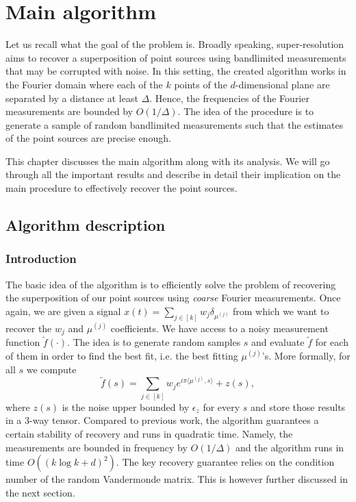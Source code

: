\chapter{Main algorithm}
Let us recall what the goal of the problem is. Broadly speaking, super-resolution aims to recover a superposition of point sources using bandlimited measurements that may be corrupted with noise. In this setting, the created algorithm works in the Fourier domain where each of the $k$ points of the $d$-dimensional plane are separated by a distance at least $\Delta$. Hence, the frequencies of the Fourier measurements are bounded by $O(1/\Delta)$. The idea of the procedure is to generate a sample of random bandlimited measurements such that the estimates of the point sources are precise enough.\par 
This chapter discusses the main algorithm along with its analysis. We will go through all the important results and describe in detail their implication on the main procedure to effectively recover the point sources.

\section{Algorithm description}
\subsection{Introduction}
The basic idea of the algorithm is to efficiently solve the problem of recovering the superposition of our point sources using \textit{coarse} Fourier measurements. Once again, we are given a signal $x(t)=\sum_{j\in[k]}w_j\delta_{\mu^{(j)}}$ from which we want to recover the $w_j$ and $\mu^{(j)}$ coefficients. We have access to a noisy measurement function $\tilde{f}(\cdot)$. The idea is to generate random samples $s$ and evaluate $\tilde{f}$ for each of them in order to find the best fit, i.e. the best fitting $\mu^{(j)}$'s. More formally, for all $s$ we compute $$\tilde{f}(s)=\sum_{j\in[k]}w_je^{i\pi\langle\mu^{(j)},s\rangle}+z(s),$$ where $z(s)$ is the noise upper bounded by $\epsilon_z$ for every $s$ and store those results in a 3-way tensor. Compared to previous work, the algorithm guarantees a certain stability of recovery and runs in quadratic time. Namely, the measurements are bounded in frequency by $O(1/\Delta)$ and the algorithm runs in time $O((k\log k+d)^2)$. The key recovery guarantee relies on the condition number of the random Vandermonde matrix. This is however further discussed in the next section.
